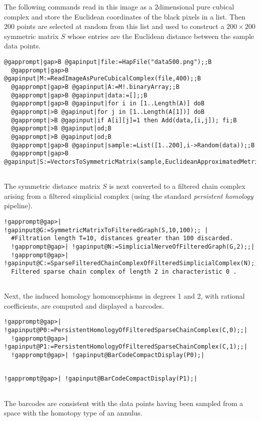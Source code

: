 \documentclass[a4paper,11pt]{report}
\begin{document}
{{ The following commands read in this image as a $2$\texttt{}dimensional pure cubical complex and store the Euclidean
coordinates of the black pixels in a list. Then 200 points are selected at
random from this list and used to construct a $200\times 200$ symmetric matrix $S$ whose entries are the Euclidean distance between the sample data points. 
\begin{Verbatim}[commandchars=@|B,fontsize=\small,frame=single,label=Example]
  @gapprompt|gap>B @gapinput|file:=HapFile("data500.png");;B
  @gapprompt|gap>B @gapinput|M:=ReadImageAsPureCubicalComplex(file,400);;B
  @gapprompt|gap>B @gapinput|A:=M!.binaryArray;;B
  @gapprompt|gap>B @gapinput|data:=[];;B
  @gapprompt|gap>B @gapinput|for i in [1..Length(A)] doB
  @gapprompt|>B @gapinput|for j in [1..Length(A[1])] doB
  @gapprompt|>B @gapinput|if A[i][j]=1 then Add(data,[i,j]); fi;B
  @gapprompt|>B @gapinput|od;B
  @gapprompt|>B @gapinput|od;B
  @gapprompt|gap>B @gapinput|sample:=List([1..200],i->Random(data));;B
  @gapprompt|gap>B @gapinput|S:=VectorsToSymmetricMatrix(sample,EuclideanApproximatedMetric);;B
  
\end{Verbatim}
 The symmetric distance matrix $S$ is next converted to a filtered chain complex arising from a filtered
simplicial complex (using the standard \emph{persistent homology} pipeline). 
\begin{Verbatim}[commandchars=!@|,fontsize=\small,frame=single,label=Example]
  !gapprompt@gap>| !gapinput@G:=SymmetricMatrixToFilteredGraph(S,10,100);; |
  #Filtration length T=10, distances greater than 100 discarded.
  !gapprompt@gap>| !gapinput@N:=SimplicialNerveOfFilteredGraph(G,2);;|
  !gapprompt@gap>| !gapinput@C:=SparseFilteredChainComplexOfFilteredSimplicialComplex(N);;|
  Filtered sparse chain complex of length 2 in characteristic 0 .
  
\end{Verbatim}
 Next, the induced homology homomorphisms in degrees 1 and 2, with rational
coefficients, are computed and displayed a barcodes. 
\begin{Verbatim}[commandchars=!@|,fontsize=\small,frame=single,label=Example]
  !gapprompt@gap>| !gapinput@P0:=PersistentHomologyOfFilteredSparseChainComplex(C,0);;|
  !gapprompt@gap>| !gapinput@P1:=PersistentHomologyOfFilteredSparseChainComplex(C,1);;|
  !gapprompt@gap>| !gapinput@BarCodeCompactDisplay(P0);|
  
\end{Verbatim}
 

 

 
\begin{Verbatim}[commandchars=!@|,fontsize=\small,frame=single,label=Example]
  !gapprompt@gap>| !gapinput@BarCodeCompactDisplay(P1);|
  
\end{Verbatim}
 

 

 The barcodes are consistent with the data points having been sampled from a
space with the homotopy type of an annulus. }

 }
\end{document}
